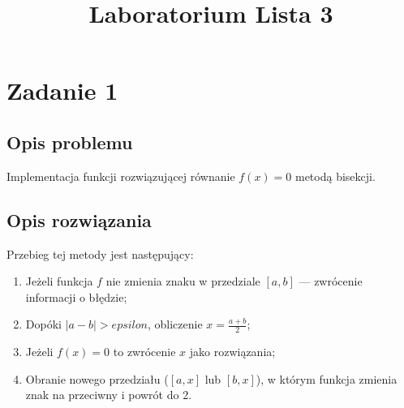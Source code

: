 \documentclass{classrep}
\author{
  \studentinfo{Agata Jasionowska}{229726}
}
\title{Laboratorium \ppauza Lista 3}
\begin{document}
\maketitle

\section{Zadanie 1}
	\subsection{Opis problemu}
		Implementacja funkcji rozwiązującej równanie $f(x)=0$ metodą bisekcji.
	
	\subsection{Opis rozwiązania}
		Przebieg tej metody jest następujący:
		\begin{enumerate}
			\item Jeżeli funkcja $f$ nie zmienia znaku w przedziale $[a,b]$ --- zwrócenie informacji o błędzie;
			\item Dopóki $|a-b|>epsilon$, obliczenie $x=\frac{a+b}{2}$;
			\item Jeżeli $f(x)=0$ to zwrócenie $x$ jako rozwiązania;
			\item Obranie nowego przedziału ($[a,x]$ lub $[b,x]$), w którym funkcja zmienia znak na przeciwny i powrót do 2.
		\end{enumerate}	 
	
\end{document}
